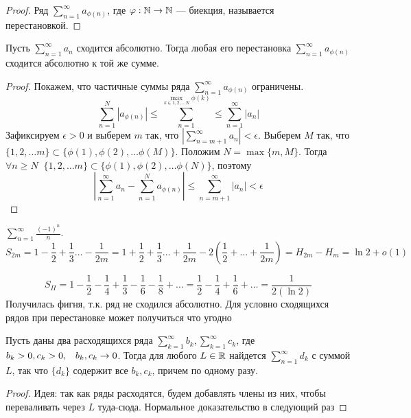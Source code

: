 \begin{proof}
    Ряд \(\sum_{n = 1}^\infty a_{\phi(n)}\), где \(\varphi: \mathbb{N} \rightarrow \mathbb{N}\) --- биекция, называется перестановкой.
\end{proof}
\begin{theorem}
    Пусть \(\sum_{n = 1}^{\infty} a_n\) сходится абсолютно. Тогда любая его перестановка \(\sum_{n = 1}^\infty a_{\phi(n)}\) сходится абсолютно к той же сумме.
\end{theorem}
\begin{proof}
    Покажем, что частичные суммы ряда \(\sum_{n = 1}^\infty a_{\phi(n)}\) ограничены.
    \[\sum_{n = 1}^N|a_{\phi(n)}| \le \sum_{n = 1}^{\max_{k \in {1, 2, \dots N}}\phi(k)} \le \sum_{n = 1}^\infty |a_n|\]
    Зафиксируем \(\epsilon > 0\) и выберем \(m\) так, что \(\left|\sum_{n = m + 1}^\infty a_n\right| < \epsilon\). Выберем \(M\) так, что \(\{1, 2, \dots m\} \subset \{\phi(1), \phi(2), \dots \phi(M)\}\). Положим \(N = \max \{m, M\}\). Тогда \(\forall n \ge N\;\;\{1, 2, \dots m\} \subset \{\phi(1), \phi(2), \dots \phi(N)\}\), поэтому 
    \[\left|\sum_{n = 1}^\infty a_n - \sum_{n = 1}^N a_{\phi(n)}\right| \le \sum_{n = m + 1}^\infty |a_n| < \epsilon\]
\end{proof}
\begin{example}
    \(\sum_{n = 1}^\infty \frac{(-1)^n}{n}\).
    \[S_{2m} = 1 - \frac{1}{2} + \frac{1}{3} \dots - \frac{1}{2m} = 1 + \frac{1}{2} + \frac{1}{3} \dots + \frac{1}{2m} - 2\left(\frac{1}{2} + \dots + \frac{1}{2m}\right) = H_{2m} - H_m = \ln 2 + o(1)\]
\end{example}
\begin{example}
    \[S_\Pi = 1 - \frac{1}{2} - \frac{1}{4} + \frac{1}{3} - \frac{1}{6} - \frac{1}{8} + \dots = \frac{1}{2} - \frac{1}{4} + \frac{1}{6} + \dots = \frac{1}{2\left(\ln 2\right)}\]
    Получилась фигня, т.к. ряд не сходился абсолютно. Для условно сходящихся рядов при перестановке может получиться что угодно
\end{example}

\begin{lemma}
    Пусть даны два расходящихся ряда \(\sum_{k = 1}^\infty b_k, \sum_{k = 1}^\infty c_k\), где \(b_k > 0, c_k > 0,\;\;\;b_k, c_k \rightarrow 0\). Тогда для любого \(L \in \mathbb{R}\) найдется \(\sum_{n = 1}^\infty d_k\) с суммой \(L\), так что \(\{d_k\}\) содержит все \(b_k, c_k\), причем по одному разу.
\end{lemma}
\begin{proof}
    Идея: так как ряды расходятся, будем добавлять члены из них, чтобы переваливать через \(L\) туда-сюда. Нормальное доказательство в следующий раз
\end{proof}